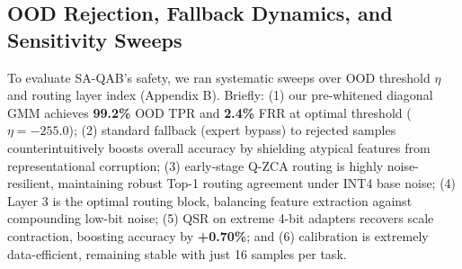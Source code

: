 \subsection{OOD Rejection, Fallback Dynamics, and Sensitivity Sweeps}
To evaluate SA-QAB's safety, we ran systematic sweeps over OOD threshold $\eta$ and routing layer index (Appendix B). Briefly: (1) our pre-whitened diagonal GMM achieves \textbf{99.2\%} OOD TPR and \textbf{2.4\%} FRR at optimal threshold ($\eta = -255.0$); (2) standard fallback (expert bypass) to rejected samples counterintuitively boosts overall accuracy by shielding atypical features from representational corruption; (3) early-stage Q-ZCA routing is highly noise-resilient, maintaining robust Top-1 routing agreement under INT4 base noise; (4) Layer 3 is the optimal routing block, balancing feature extraction against compounding low-bit noise; (5) QSR on extreme 4-bit adapters recovers scale contraction, boosting accuracy by \textbf{+0.70\%}; and (6) calibration is extremely data-efficient, remaining stable with just 16 samples per task.
